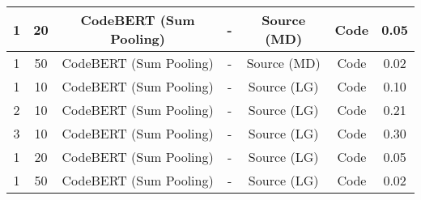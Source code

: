\begin{longtable}{|c|c|c|c|c|c|c|}
\hline
1 & 20 & CodeBERT (Sum Pooling) & - & Source (MD) & Code & 0.05 \\
\hline
1 & 50 & CodeBERT (Sum Pooling) & - & Source (MD) & Code & 0.02 \\
\hline
1 & 10 & CodeBERT (Sum Pooling) & - & Source (LG) & Code & 0.10 \\
\hline
2 & 10 & CodeBERT (Sum Pooling) & - & Source (LG) & Code & 0.21 \\
\hline
3 & 10 & CodeBERT (Sum Pooling) & - & Source (LG) & Code & 0.30 \\
\hline
1 & 20 & CodeBERT (Sum Pooling) & - & Source (LG) & Code & 0.05 \\
\hline
1 & 50 & CodeBERT (Sum Pooling) & - & Source (LG) & Code & 0.02 \\
\hline
\end{longtable}
